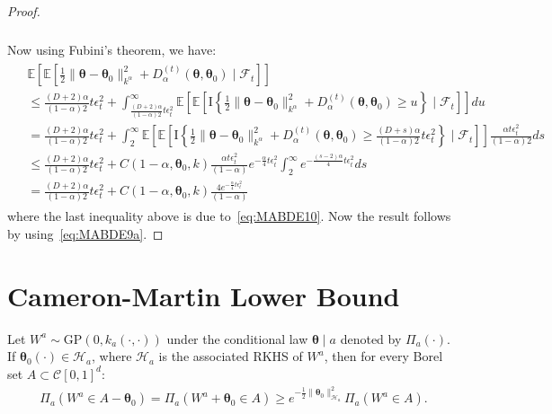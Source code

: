 \documentclass[final,12pt]{colt2026} %
\begin{document}
\begin{proof}
\begin{align*}
\begin{split}
\end{split}
\end{align*}
Now using Fubini's theorem, we have:
\begin{align}
\begin{split}
&\mathbb{E}\left[\mathbb{E}\left[\frac{1}{2}\|\pmb \theta-\pmb \theta_0\|_{k^\alpha}^2 + D_{\alpha}^{(t)}(\pmb \theta,\pmb \theta_0)\;\Big|\; \mathcal{F}_{t} \right]\right]
\\
& \leq \frac{(D+2)\alpha}{(1-\alpha)2} t\epsilon_t^2 + \int_{\frac{(D+2)\alpha}{(1-\alpha)2} t\epsilon_t^2}^{\infty} \mathbb{E}\left[\mathbb{E}\left[\text{I}\left\{ \frac{1}{2}\|\pmb \theta-\pmb \theta_0\|_{k^\alpha}^2 + D_{\alpha}^{(t)}(\pmb \theta,\pmb \theta_0) \geq u \right\} \;\Big|\; \mathcal{F}_{t} \right]\right]  du
\\
& = \frac{(D+2)\alpha}{(1-\alpha)2} t\epsilon_t^2 + \int_{2}^{\infty} \mathbb{E}\left[\mathbb{E}\left[\text{I}\left\{\frac{1}{2}\|\pmb \theta-\pmb \theta_0\|_{k^\alpha}^2 + D_{\alpha}^{(t)}(\pmb \theta,\pmb \theta_0) \geq \frac{(D+s)\alpha}{(1-\alpha)2} t\epsilon_t^2 \right\} \;\Big|\; \mathcal{F}_{t} \right]\right] \frac{\alpha t\epsilon_t^2}{(1-\alpha)2}  ds
\\
& \leq \frac{(D+2)\alpha}{(1-\alpha)2} t\epsilon_t^2 + C(1-\alpha,\pmb \theta_0,k) \frac{\alpha t\epsilon_t^2}{(1-\alpha)}   e^{ - \frac{\alpha}{4}  t \epsilon_t^2 }  \int_{2}^{\infty}  e^{ - \frac{(s-2)\alpha}{4}  t \epsilon_t^2 } ds 
\\
&= \frac{(D+2)\alpha}{(1-\alpha)2} t\epsilon_t^2 + C(1-\alpha,\pmb \theta_0,k) \frac{4e^{ - \frac{\alpha}{4}  t \epsilon_t^2 } }{(1-\alpha)} 
\end{split}
\end{align}
where the last inequality above is due to~\eqref{eq:MABDE10}. Now the result follows by using~\eqref{eq:MABDE9a}.
\end{proof}


\section{Cameron-Martin Lower Bound}\label{app:cameron-martin-formula}

\begin{lemma}
\label{lemma:cameron-martin-formula}
Let $W^{a} \sim \mathrm{GP}(0, k_a(\cdot, \cdot))$ under the conditional law $\pmb{\theta}\mid a$ denoted by $\Pi_a(\cdot)$. If $\pmb{\theta}_0(\cdot) \in \mathcal{H}_a$, where $\mathcal{H}_a$ is the associated RKHS of $W^{a}$, then for every Borel set $A\subset \mathcal{C}[0, 1]^d$:
\begin{align*}
    \Pi_a\left(W^{a} \in A - \pmb{\theta}_0\right) = \Pi_a\left(W^{a} + \pmb\theta_0 \in A\right) \geq e^{-\frac{1}{2}\lVert \pmb\theta_0\rVert^{2}_{\mathcal{H}_a}}\Pi_a\left(W^{a} \in A\right).
\end{align*}
\end{lemma}
\end{document}
